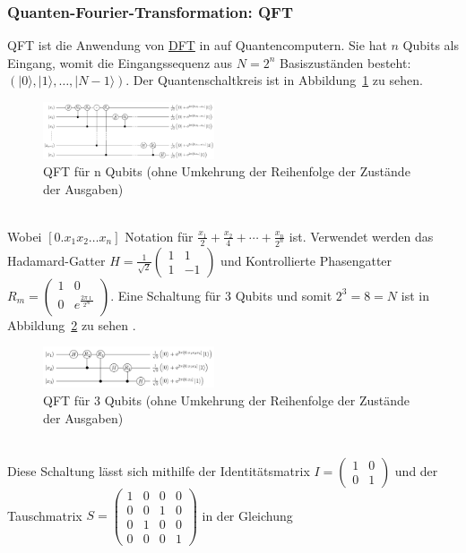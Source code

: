 \subsubsection{Quanten-Fourier-Transformation: QFT}\label{sec:QFT}
QFT ist die Anwendung von \hyperref[sec:DFT]{DFT} in auf Quantencomputern. Sie hat \(n\) Qubits als Eingang, womit die Eingangssequenz aus \(N = 2^n\) Basiszuständen besteht: \(\left(|0\rangle,|1\rangle,\dots,|N-1\rangle\right)\). Der Quantenschaltkreis ist in Abbildung~\ref{fig:QFT_n_Qubits} zu sehen.
\begin{figure}[hb]
	\centering
	\includegraphics[width=0.45\textwidth]{sections/felix/Q_fourier_nqubits.png}
	\caption{QFT für n Qubits (ohne Umkehrung der Reihenfolge der Zustände der Ausgaben) \cite{noauthor_q_fourier_nqubitspng_2018}}
	\label{fig:QFT_n_Qubits}
\end{figure}
\\Wobei \(\left[0.x_1 x_2 \dots x_n\right]\) Notation für \(\frac{x_1}{2}+\frac{x_2}{4}+\cdots+\frac{x_n}{2^n}\) ist.
Verwendet werden das Hadamard-Gatter \(H = \frac{1}{\sqrt{2}}\begin{pmatrix}
	1 &  1\\
	1 & -1
\end{pmatrix}\) und Kontrollierte Phasengatter \(R_m = \begin{pmatrix}
	1 & 0\\
	0 & e^{\frac{2\pi\imath}{2^m}}\\
\end{pmatrix}\).
Eine Schaltung für \(3\) Qubits und somit \(2^3 = 8 = N\) ist in Abbildung~\ref{fig:QFT_3_Qubits} zu sehen \cite{noauthor_list_2024}.\\
\begin{figure}[hb]
	\centering
	\includegraphics[width=0.45\textwidth]{sections/felix/Q_fourier_3qubits.png}
	\caption{QFT für 3 Qubits (ohne Umkehrung der Reihenfolge der Zustände der Ausgaben) \cite{noauthor_q_fourier_3qubitspng_2018}}
	\label{fig:QFT_3_Qubits}
\end{figure}
\\Diese Schaltung lässt sich mithilfe der Identitätsmatrix \(I = \begin{pmatrix}
	1 & 0 \\
	0 & 1 
\end{pmatrix}\) und der Tauschmatrix \(S = \begin{pmatrix}
	1 & 0 & 0 & 0\\
	0 & 0 & 1 & 0\\
	0 & 1 & 0 & 0\\
	0 & 0 & 0 & 1
\end{pmatrix}\) in der Gleichung
